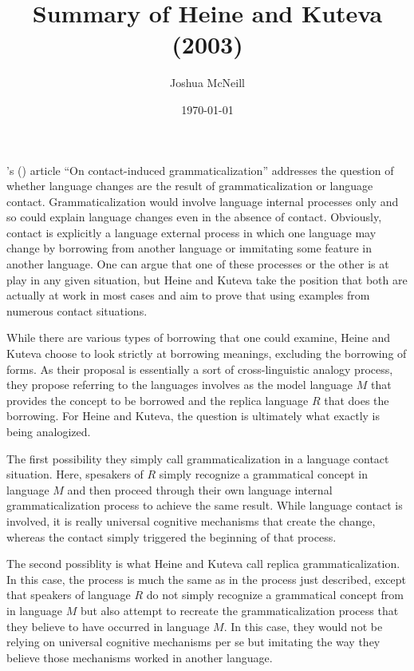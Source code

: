 \documentclass{article}
\title{Summary of Heine and Kuteva (2003)}
\author{Joshua McNeill}
\date{\today}
\begin{document}
  \maketitle
  \onehalfspacing
  \citeauthor{heine_contact-induced_2003}'s (\citeyear{heine_contact-induced_2003}) article ``On contact-induced grammaticalization'' addresses the question of whether language changes are the result of grammaticalization or language contact.
  Grammaticalization would involve language internal processes only and so could explain language changes even in the absence of contact.
  Obviously, contact is explicitly a language external process in which one language may change by borrowing from another language or immitating some feature in another language.
  One can argue that one of these processes or the other is at play in any given situation, but Heine and Kuteva take the position that both are actually at work in most cases and aim to prove that using examples from numerous contact situations.

  While there are various types of borrowing that one could examine, Heine and Kuteva choose to look strictly at borrowing meanings, excluding the borrowing of forms.
  As their proposal is essentially a sort of cross-linguistic analogy process, they propose referring to the languages involves as the model language $M$ that provides the concept to be borrowed and the replica language $R$ that does the borrowing.
  For Heine and Kuteva, the question is ultimately what exactly is being analogized.

  The first possibility they simply call grammaticalization in a language contact situation.
  Here, spesakers of $R$ simply recognize a grammatical concept in language $M$ and then proceed through their own language internal grammaticalization process to achieve the same result.
  While language contact is involved, it is really universal cognitive mechanisms that create the change, whereas the contact simply triggered the beginning of that process.

  The second possiblity is what Heine and Kuteva call replica grammaticalization.
  In this case, the process is much the same as in the process just described, except that speakers of language $R$ do not simply recognize a grammatical concept from in language $M$ but also attempt to recreate the grammaticalization process that they believe to have occurred in language $M$.
  In this case, they would not be relying on universal cognitive mechanisms per se but imitating the way they believe those mechanisms worked in another language.
\end{document}
